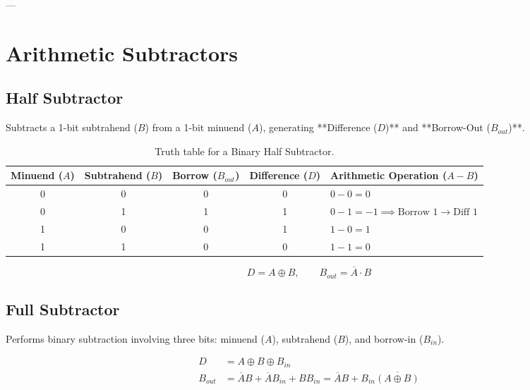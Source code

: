 ---

\section{Arithmetic Subtractors}

\subsection{Half Subtractor}
Subtracts a 1-bit subtrahend ($B$) from a 1-bit minuend ($A$), generating **Difference ($D$)** and **Borrow-Out ($B_{out}$)**.

\begin{table}[htbp]
\centering
\small
\begin{tabularx}{\textwidth}{cc|cc|X}
\toprule
\textbf{Minuend ($A$)} & \textbf{Subtrahend ($B$)} & \textbf{Borrow ($B_{out}$)} & \textbf{Difference ($D$)} & \textbf{Arithmetic Operation ($A - B$)} \\
\midrule
0 & 0 & 0 & 0 & $0 - 0 = 0$ \\
0 & 1 & 1 & 1 & $0 - 1 = -1 \implies \text{Borrow } 1 \rightarrow \text{Diff } 1$ \\
1 & 0 & 0 & 1 & $1 - 0 = 1$ \\
1 & 1 & 0 & 0 & $1 - 1 = 0$ \\
\bottomrule
\end{tabularx}
\caption{Truth table for a Binary Half Subtractor.}
\label{tab:half-subtractor}
\end{table}

\begin{keyequation}
\begin{equation}
    D = A \oplus B, \qquad B_{out} = \overline{A} \cdot B
\end{equation}
\end{keyequation}

\subsection{Full Subtractor}
Performs binary subtraction involving three bits: minuend ($A$), subtrahend ($B$), and borrow-in ($B_{in}$).

\begin{keyequation}
\begin{align}
    D &= A \oplus B \oplus B_{in} \\
    B_{out} &= \overline{A}B + \overline{A}B_{in} + BB_{in} = \overline{A}B + B_{in}\overline{(A \oplus B)}
\end{align}
\end{keyequation}

